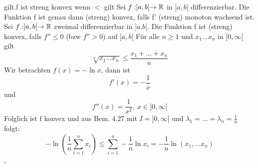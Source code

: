 gilt.\newline f ist streng konvex wenn \( < \) gilt \newline
\Satz[4.29] Sei \(f : ]a,b[ \rightarrow \mathbb{R} \) in \(]a,b[\) differenzierbar. Die Funktion f ist genau dann (streng) konvex, falls f' (streng) monoton wachsend ist. \newline \newline \newline
\Korollar[4.30] Sei \(f : ]a,b[ \rightarrow \mathbb{R} \) zweimal differenzierbar in \(]a.b[\). Die Funktion f ist (streng) konvex, falls \(f'' \leq 0\) (bzw \(f'' > 0\)) auf \(]a,b[\) \newline
\Bsp[4.31] Für alle \( n \geq 1 \) und \( x_1 \dots x_n\) in \( ]0, \infty [\) gilt
\[ \sqrt[n]{x_1 \dots x_n} \leq \frac{x_1 + \dots + x_n}{n}\]
Wir betrachten \( f(x) = - \ln x\), dann ist
\[ f'(x) = -\frac{1}{x}\]
und
\[ f''(x) = \frac{1}{x^2}, \ x \in ]0,\infty [\]
Folglich ist f konvex und aus Bem. 4.27 mit \newline \( I = ]0,\infty [\) und \( \lambda_1 = \dots = \lambda_n = \frac{1}{n}\) folgt:
\[ -\ln \left( \frac{1}{n} \sum_{i = 1}^{n} x_i\right) \leq \sum_{i=1}^{n} -\frac{1}{n} \ln x_i = -\frac{1}{n} \ln (x_1, \dots x_n)\]
\sep
